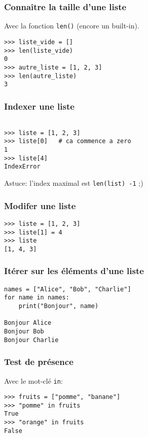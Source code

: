 \documentclass{beamer}
\begin{document}
\begin{frame}[fragile]
  \frametitle{Connaître la taille d'une liste}
Avec la fonction \texttt{len()} (encore un built-in).

\vfill

\begin{lstlisting}
>>> liste_vide = []
>>> len(liste_vide)
0
>>> autre_liste = [1, 2, 3]
>>> len(autre_liste)
3
\end{lstlisting}

\end{frame}



\begin{frame}[fragile]
  \frametitle{Indexer une liste}

\begin{lstlisting}

>>> liste = [1, 2, 3]
>>> liste[0]   # ca commence a zero
1
>>> liste[4]
IndexError
\end{lstlisting}

\vfill

Astuce: l'index maximal est \texttt{len(list) -1} ;)

\end{frame}

\begin{frame}[fragile]
  \frametitle{Modifer une liste}
\begin{lstlisting}
>>> liste = [1, 2, 3]
>>> liste[1] = 4
>>> liste
[1, 4, 3]
\end{lstlisting}

\end{frame}

\begin{frame}[fragile]
  \frametitle{Itérer sur les éléments d'une liste}
\begin{lstlisting}
names = ["Alice", "Bob", "Charlie"]
for name in names:
    print("Bonjour", name)

Bonjour Alice
Bonjour Bob
Bonjour Charlie
\end{lstlisting}

\end{frame}

\begin{frame}[fragile]
  \frametitle{Test de présence}

Avec le mot-clé \texttt{in}:

\vfill

\begin{lstlisting}
>>> fruits = ["pomme", "banane"]
>>> "pomme" in fruits
True
>>> "orange" in fruits
False
\end{lstlisting}

\end{frame}
\end{document}
